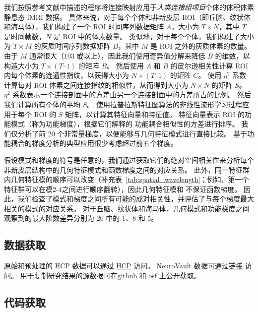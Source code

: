 \documentclass[lang=cn,a4paper,newtx,citestyle=gb7714-2015, bibstyle=gb7714-2015]{elegantpaper}
\begin{document}
我们按照参考文献中描述的程序将连接映射应用于\textit{人类连接组项目}个体的体积体素静息态 fMRI 数据\cite{haak2018connectopic}。
具体来说，对于每个个体和非新皮层 ROI（即丘脑、纹状体和海马体），我们构建了一个 ROI 时间序列数据矩阵 $ A $，大小为 $ T \times N $，其中 $ T $ 是时间帧数，$ N $ 是 ROI 中的体素数量。
类似地，对于每个个体，我们构建了大小为 $ T \times M $ 的灰质时间序列数据矩阵 $ B $，其中 $ M $ 是 ROI 之外的灰质体素的数量。
由于 $ M $ 通常很大（103 或以上），因此我们使用奇异值分解来降低 $ B $ 的维数，以构造大小为 $ T \times (T – 1) $ 的矩阵 $ B $。
然后使用 $ A $ 和 $ B $ 的皮尔逊相关性计算 ROI 内每个体素的连通性指纹，以获得大小为 $ N \times (T – 1) $ 的矩阵 $ C $。
使用 $ \eta^2 $ 系数 \cite{alexander2018testing} 计算每对 ROI 体素之间连接指纹的相似性，从而得到大小为 $ N \times N $ 的矩阵 $ S $。
$ \eta^2 $ 系数表示一个连接剖面中的方差由另一个连接剖面中的方差所占的比例。
然后我们计算所有个体的平均 $ S $。 
使用拉普拉斯特征图算法\cite{belkin2003laplacian}的非线性流形学习过程应用于每个 ROI 的 $ S $ 矩阵，以计算其特征向量和特征值。
特征向量表示 ROI 的功能模式（称为功能梯度），根据它们解释的 功能耦合相似性的方差进行排序。
我们仅分析了前 20 个非常量梯度，以便能够与几何特征模式进行直接比较。
基于功能耦合的梯度分析的典型应用很少考虑超过前五个梯度\cite{haak2018connectopic,margulies2016situating}。


假设模式和梯度的符号是任意的，我们通过获取它们的绝对空间相关性来分析每个非新皮层结构中的几何特征模式和函数梯度之间的对应关系。
此外，同一特征群内几何特征模的顺序可以改变（补充表~\ref{tab:spatial_wavelength}；例如，第一个特征群可以在模2-4之间进行顺序翻转），因此几何特征模和 不保证函数梯度。
因此，我们检查了模式和梯度之间所有可能的成对相关性，并评估了与每个梯度最大相关的模式的对应关系。
对于丘脑、纹状体和海马体，几何模式和功能梯度之间观察到的最大阶数差异分别为 20 中的 1、8 和 5。


\subsection{数据获取} \label{sec:data_availability}

原始和预处理的 HCP 数据可以通过 \href{https://db. human connectome.org/}{HCP} 访问。
NeuroVault 数据可通过\href{https://neurovault.org/}{链接} 访问。
用于复制研究结果的源数据可在\href{https://github.com/NSBLab/BrainEigenmodes}{github}  和 \href{https://osf.io/xczmp/}{osf} 上公开获取。

\subsection{代码获取} \label{sec:code_availability}
\end{document}
